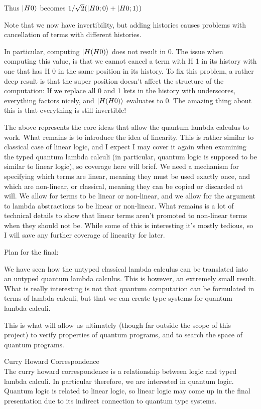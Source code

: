 \documentclass{article}
\theoremstyle{plain}
\theoremstyle{definition}
\theoremstyle{remark}
\begin{document}
Thus $\left|\mspace{0.5mu} H 0 \mspace{0.5mu}\right\rangle$ becomes $1/\sqrt{2} (\left|\mspace{0.5mu} H 0; 0 \mspace{0.5mu}\right\rangle + \left|\mspace{0.5mu} H 0; 1 \mspace{0.5mu}\right\rangle)$


Note that we now have invertibility, but adding histories causes problems with cancellation of terms with different histories.

In particular, computing  $\left|\mspace{0.5mu} H (H 0) \mspace{0.5mu}\right\rangle$ does not result in 0. The issue when computing this value, is that we cannot cancel a term with H 1 in its history with one that has H 0 in the same position in its history. To fix this problem, a rather deep result is that the super position doesn't affect the structure of the computation: If we replace all 0 and 1 kets in the history with underscores, everything factors nicely, and $\left|\mspace{0.5mu} H (H 0) \mspace{0.5mu}\right\rangle$ evaluates to 0. The amazing thing about this is that everything is still invertible!
$$$$

The above represents the core ideas that allow the quantum lambda calculus to work.
What remains is to introduce the idea of linearity. This is rather similar to classical case of linear logic, and I expect I may cover it again when examining the typed quantum lambda calculi (in particular, quantum logic is supposed to be similar to linear logic), so coverage here will brief. We need a mechanism for specifying which terms are linear, meaning they must be used exactly once, and which are non-linear, or classical, meaning they can be copied or discarded at will. We allow for terms to be linear or non-linear, and we allow for the argument to lambda abstractions to be linear or non-linear. What remains is a lot of technical details to show that linear terms aren't promoted to non-linear terms when they should not be. While some of this is interesting it's mostly tedious, so I will save any further coverage of linearity for later.


Plan for the final:

We have seen how the untyped classical lambda calculus can be translated into an untyped quantum lambda calculus.
This is however, an extremely small result. What is really interesting is not that quantum computation can be formulated in terms of lambda calculi,
but that we can create type systems for quantum lambda calculi.

This is what will allow us ultimately (though far outside the scope of this project) to verify properties of quantum programs, and to search the space of quantum programs.

$$$$
Curry Howard Correspondence
$$$$
The curry howard correspondence is a relationship between logic and typed lambda calculi.
In particular therefore, we are interested in quantum logic.
Quantum logic is related to linear logic, so linear logic may come up in the final presentation due to its indirect connection to quantum type systems.
\end{document}
